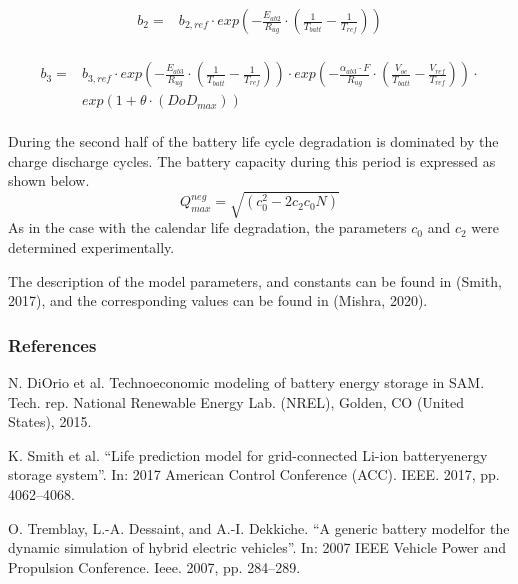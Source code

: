 \begin{equation}
\begin{split}
    b_2 = & b_{2,ref} \cdot exp\left(-\frac{E_{ab2}}{R_{ug}} \cdot \left(\frac{1}{T_{batt}} - \frac{1}{T_{ref}}\right) \right) \\
\end{split}
\label{Equation: b2_computation}
\end{equation}

\begin{equation}
\begin{split}
    b_3 = & b_{3,ref} \cdot exp\left(-\frac{E_{ab3}}{R_{ug}} \cdot \left(\frac{1}{T_{batt}} - \frac{1}{T_{ref}}\right) \right) \cdot
exp\left(-\frac{\alpha_{ab3}\cdot F}{R_{ug}} \cdot \left(\frac{V_{oc}}{T_{batt}} - \frac{V_{ref}}{T_{ref}}\right) \right) \cdot  \\
& exp\left(1 + \theta \cdot (DoD_{max})\right) \\
\end{split}
\label{Equation: b3_computation}
\end{equation}

During the second half of the battery life cycle degradation is dominated by the charge discharge cycles. The battery capacity during this period is expressed as shown below.  
\begin{equation}
Q_{max}^{neg}=\sqrt{(c_0^2-2c_2 c_0 N)}                             
\label{Equation: b2_computation}
\end{equation}
As in the case with the calendar life degradation, the parameters $c_0$ and $c_2$ were determined experimentally. 

The description of the model parameters, and constants can be found in (Smith, 2017), and the corresponding values can be found in (Mishra, 2020).

\subsubsection{References}\label{references-022}

N. DiOrio et al. Technoeconomic modeling of battery energy storage in SAM. Tech. rep. National Renewable Energy Lab. (NREL), Golden, CO (United States), 2015.

\noindent
K.  Smith  et  al.  “Life  prediction  model  for  grid-connected  Li-ion  batteryenergy  storage  system”.  In: 2017 American Control Conference (ACC). IEEE. 2017, pp. 4062–4068.

\noindent
O. Tremblay, L.-A. Dessaint, and A.-I. Dekkiche. “A generic battery modelfor the dynamic simulation of hybrid electric vehicles”. In: 2007 IEEE Vehicle Power and Propulsion Conference. Ieee. 2007, pp. 284–289.

